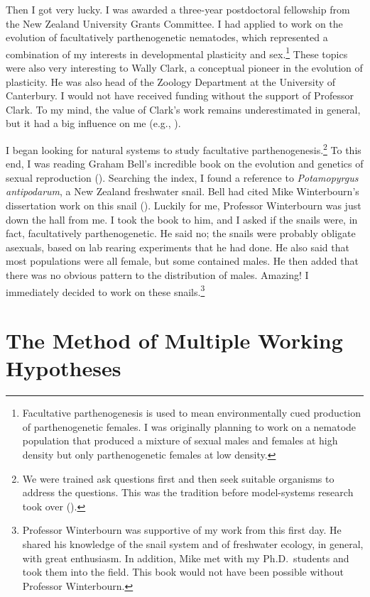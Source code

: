 \documentclass[
  letterpaper,
]{book}
\begin{document}
Then I got very lucky. I was awarded a three-year postdoctoral
fellowship from the New Zealand University Grants Committee. I had
applied to work on the evolution of facultatively parthenogenetic
nematodes, which represented a combination of my interests in
developmental plasticity and sex.\footnote{Facultative parthenogenesis
  is used to mean environmentally cued production of parthenogenetic
  females. I was originally planning to work on a nematode population
  that produced a mixture of sexual males and females at high density
  but only parthenogenetic females at low density.} These topics were
also very interesting to Wally Clark, a conceptual pioneer in the
evolution of plasticity. He was also head of the Zoology Department at
the University of Canterbury. I would not have received funding without
the support of Professor Clark. To my mind, the value of Clark's work
remains underestimated in general, but it had a big influence on me
(e.g., ).

I began looking for natural systems to study facultative
parthenogenesis.\footnote{We were trained ask questions first and then
  seek suitable organisms to address the questions. This was the
  tradition before model-systems research took over
  ().} To this end, I was
reading Graham Bell's incredible book on the evolution and genetics of
sexual reproduction (). Searching the
index, I found a reference to \emph{Potamopyrgus antipodarum}, a New
Zealand freshwater snail. Bell had cited Mike Winterbourn's dissertation
work on this snail (). Luckily for
me, Professor Winterbourn was just down the hall from me. I took the
book to him, and I asked if the snails were, in fact, facultatively
parthenogenetic. He said no; the snails were probably obligate asexuals,
based on lab rearing experiments that he had done. He also said that
most populations were all female, but some contained males. He then
added that there was no obvious pattern to the distribution of males.
Amazing! I immediately decided to work on these snails.\footnote{Professor
  Winterbourn was supportive of my work from this first day. He shared
  his knowledge of the snail system and of freshwater ecology, in
  general, with great enthusiasm. In addition, Mike met with my
  Ph.D.~students and took them into the field. This book would not have
  been possible without Professor Winterbourn.}

\section{The Method of Multiple Working
Hypotheses}\label{the-method-of-multiple-working-hypotheses}
\end{document}
